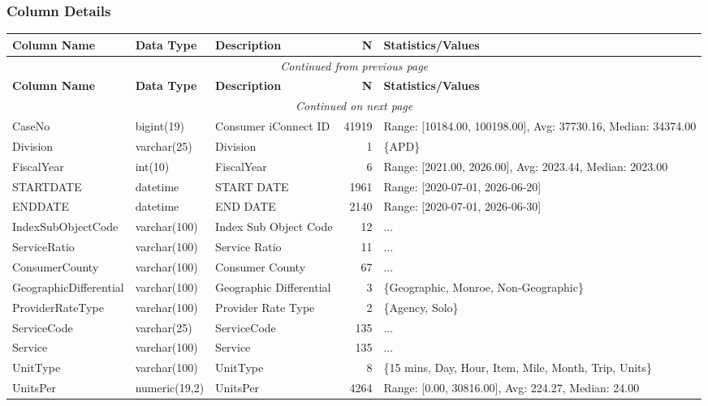 \begin{landscape}
\subsubsection{Column Details}
\begin{longtable}{|l|l|l|r|p{6cm}|}
\hline
\textbf{Column Name} & \textbf{Data Type} & \textbf{Description} & \textbf{N} & \textbf{Statistics/Values} \\
\hline
\endfirsthead
\multicolumn{5}{c}{\textit{Continued from previous page}} \\
\hline
\textbf{Column Name} & \textbf{Data Type} & \textbf{Description} & \textbf{N} & \textbf{Statistics/Values} \\
\hline
\endhead
\hline
\multicolumn{5}{c}{\textit{Continued on next page}} \\
\endfoot
\hline
\endlastfoot
CaseNo & bigint(19) & Consumer iConnect ID & 41919 & Range: [10184.00, 100198.00], Avg: 37730.16, Median: 34374.00 \\
\hline
Division & varchar(25) & Division & 1 & \{APD\} \\
\hline
FiscalYear & int(10) & FiscalYear & 6 & Range: [2021.00, 2026.00], Avg: 2023.44, Median: 2023.00 \\
\hline
STARTDATE & datetime & START DATE & 1961 & Range: [2020-07-01, 2026-06-20] \\
\hline
ENDDATE & datetime & END DATE & 2140 & Range: [2020-07-01, 2026-06-30] \\
\hline
IndexSubObjectCode & varchar(100) & Index Sub Object Code & 12 & ... \\
\hline
ServiceRatio & varchar(100) & Service Ratio & 11 & ... \\
\hline
ConsumerCounty & varchar(100) & Consumer County & 67 & ... \\
\hline
GeographicDifferential & varchar(100) & Geographic Differential & 3 & \{Geographic, Monroe, Non-Geographic\} \\
\hline
ProviderRateType & varchar(100) & Provider Rate Type & 2 & \{Agency, Solo\} \\
\hline
ServiceCode & varchar(25) & ServiceCode & 135 & ... \\
\hline
Service & varchar(100) & Service & 135 & ... \\
\hline
UnitType & varchar(100) & UnitType & 8 & \{15 mins, Day, Hour, Item, Mile, Month, Trip, Units\} \\
\hline
UnitsPer & numeric(19,2) & UnitsPer & 4264 & Range: [0.00, 30816.00], Avg: 224.27, Median: 24.00 \\

\end{longtable}
\end{landscape}
